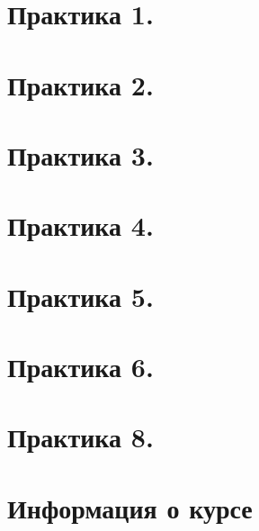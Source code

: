 \maketitle
\tableofcontents


\newpage
\section{Практика 1.}

\newpage
\section{Практика 2.}

\newpage
\section{Практика 3.}

\newpage
\section{Практика 4.}

\newpage
\section{Практика 5.}

\newpage
\section{Практика 6.}

\newpage
\section{Практика 8.}

\newpage
\section{Информация о курсе}
